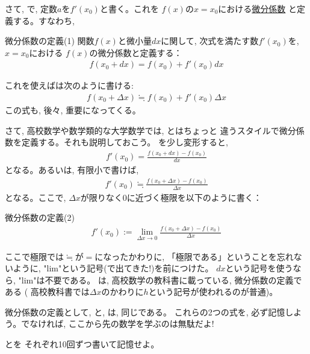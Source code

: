 さて, で, 定数$a$を$f'(x_0)$と書く。これを
$f(x)$の$x=x_0$における\underline{微分係数} 
と定義する。すなわち, 
\begin{itembox}{微分係数の定義(1)}
関数$f(x)$と微小量$dx$に関して, 次式を満たす数$f'(x_0)$を, $x=x_0$における
$f(x)$の微分係数と定義する：
\begin{eqnarray}
f(x_0+dx) = f(x_0)+f'(x_0)dx \label{eq:define_dif}
\end{eqnarray}
\end{itembox}
これを使えばは次のように書ける:
\begin{eqnarray}
f(x_0+\Delta x) \fallingdotseq f(x_0)+f'(x_0)\Delta x\label{eq:define_dif_Delta}
\end{eqnarray}
この式も, 後々, 重要になってくる。\mv

さて, 高校数学や数学類的な大学数学では, とはちょっと
違うスタイルで微分係数を定義する。それも説明しておこう。
を少し変形すると, 
\begin{eqnarray}
f'(x_0) = \frac{f(x_0+dx)-f(x_0)}{dx}\label{eq:define_dif10}
\end{eqnarray}
となる。あるいは, 有限小で書けば, 
\begin{eqnarray}
f'(x_0) \fallingdotseq \frac{f(x_0+\Delta x)-f(x_0)}{\Delta x}\label{eq:define_dif11}
\end{eqnarray}
となる。ここで, $\Delta x$が限りなく0に近づく極限を以下のように書く：
\begin{itembox}{微分係数の定義(2)}
\begin{eqnarray}
f'(x_0) :=\lim_{\Delta x \rightarrow 0} \frac{f(x_0+\Delta x)-f(x_0)}{\Delta x}\label{eq:define_dif2}
\end{eqnarray}
\end{itembox}
ここで極限では$\fallingdotseq$が$=$になったかわりに, 
「極限である」ということを忘れないように, "lim"という記号(で出てきた!)を前につけた。
$dx$という記号を使うなら, "lim"は不要である。
は, 高校数学の教科書に載っている, 微分係数の定義である (
高校教科書では$\Delta x$のかわりに$h$という記号が使われるのが普通)。

微分係数の定義として, 
と, は, 同じである。
これらの2つの式を, 必ず記憶しよう。でなければ, ここから先の数学を学ぶのは無駄だよ!

\begin{q}\label{q:diff_def00} とを
それぞれ10回ずつ書いて記憶せよ。\end{q}

